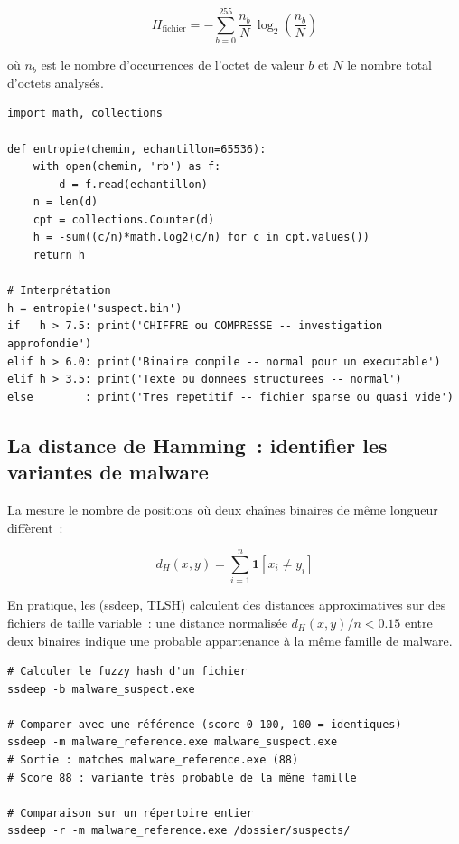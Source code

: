 \begin{equation}
H_{\text{fichier}} = -\sum_{b=0}^{255}
\frac{n_b}{N}\,\log_2\!\left(\frac{n_b}{N}\right)
\label{eq:shannon-fichier}
\end{equation}

où $n_b$ est le nombre d'occurrences de l'octet de valeur $b$ et $N$ le nombre
total d'octets analysés.

\begin{lstlisting}[language=bash_forensique,
    caption={Calcul de l'entropie d'un fichier, script Python forensique}]
import math, collections

def entropie(chemin, echantillon=65536):
    with open(chemin, 'rb') as f:
        d = f.read(echantillon)
    n = len(d)
    cpt = collections.Counter(d)
    h = -sum((c/n)*math.log2(c/n) for c in cpt.values())
    return h

# Interprétation
h = entropie('suspect.bin')
if   h > 7.5: print('CHIFFRE ou COMPRESSE -- investigation approfondie')
elif h > 6.0: print('Binaire compile -- normal pour un executable')
elif h > 3.5: print('Texte ou donnees structurees -- normal')
else        : print('Tres repetitif -- fichier sparse ou quasi vide')
\end{lstlisting}

\subsection{La distance de Hamming~: identifier les variantes de malware}

La  mesure le nombre
de positions où deux chaînes binaires de même longueur diffèrent~:

\begin{equation}
d_H(x, y) = \sum_{i=1}^{n} \mathbf{1}[x_i \neq y_i]
\label{eq:hamming}
\end{equation}

En pratique, les  (ssdeep, TLSH)
calculent des distances approximatives sur des fichiers de taille variable~:
une distance normalisée $d_H(x,y)/n < 0.15$ entre deux binaires indique
une probable appartenance à la même famille de malware.

\begin{lstlisting}[language=bash_forensique,
    caption={Fuzzy hashing avec ssdeep}]
# Calculer le fuzzy hash d'un fichier
ssdeep -b malware_suspect.exe

# Comparer avec une référence (score 0-100, 100 = identiques)
ssdeep -m malware_reference.exe malware_suspect.exe
# Sortie : matches malware_reference.exe (88)
# Score 88 : variante très probable de la même famille

# Comparaison sur un répertoire entier
ssdeep -r -m malware_reference.exe /dossier/suspects/
\end{lstlisting}

